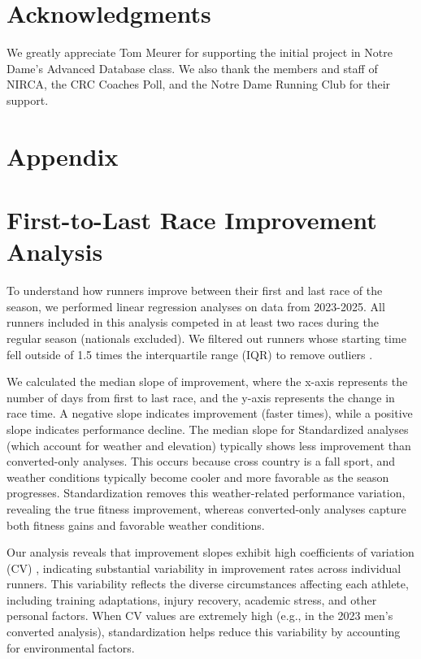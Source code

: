 \documentclass[suppldata]{interact}
\theoremstyle{plain}%
\theoremstyle{definition}
\theoremstyle{remark}
\begin{document}
\section*{Acknowledgments}
We greatly appreciate Tom Meurer for supporting the initial project in Notre Dame's Advanced Database class. We also thank the members and staff of NIRCA, the CRC Coaches Poll, and the Notre Dame Running Club for their support.








\clearpage
\appendix
\section*{Appendix}

\section{First-to-Last Race Improvement Analysis}
\label{app:first_last}

To understand how runners improve between their first and last race of the season, we performed linear regression analyses on data from 2023-2025. All runners included in this analysis competed in at least two races during the regular season (nationals excluded). We filtered out runners whose starting time fell outside of 1.5 times the interquartile range (IQR) to remove outliers \cite{wan2014estimating}.

We calculated the median slope of improvement, where the x-axis represents the number of days from first to last race, and the y-axis represents the change in race time. A negative slope indicates improvement (faster times), while a positive slope indicates performance decline. The median slope for Standardized analyses (which account for weather and elevation) typically shows less improvement than converted-only analyses. This occurs because cross country is a fall sport, and weather conditions typically become cooler and more favorable as the season progresses. Standardization removes this weather-related performance variation, revealing the true fitness improvement, whereas converted-only analyses capture both fitness gains and favorable weather conditions.

Our analysis reveals that improvement slopes exhibit high coefficients of variation (CV) \cite{abdi2010coefficient}, indicating substantial variability in improvement rates across individual runners. This variability reflects the diverse circumstances affecting each athlete, including training adaptations, injury recovery, academic stress, and other personal factors. When CV values are extremely high (e.g., in the 2023 men's converted analysis), standardization helps reduce this variability by accounting for environmental factors.
\end{document}
